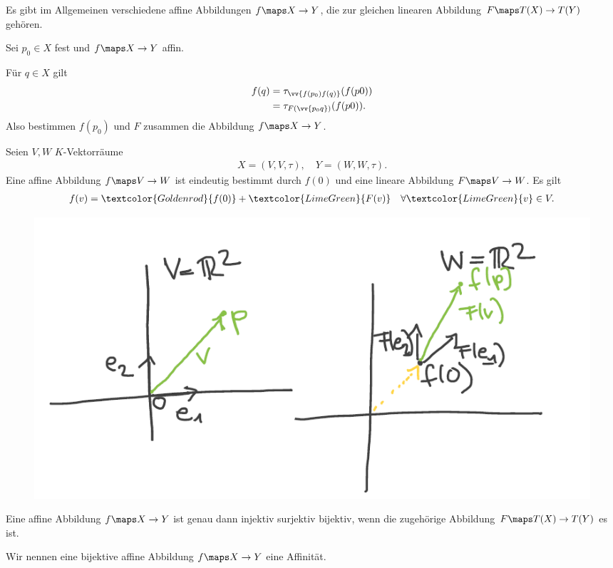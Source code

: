 \begin{bemerkung*}
    \begin{eigenschaftenenumerate}
        \item Es gibt im Allgemeinen verschiedene affine Abbildungen \( f\maps X \to Y \), die zur gleichen linearen Abbildung \( F\maps T(X)\to T(Y) \) gehören.
        \item Sei \( p_0 \in X \) fest und \( f\maps X \to Y \) affin.
        
        Für \( q\in X \) gilt
        \begin{align*}
            f(q)\begin{aligned}[t] 
                &=\tau_{\vv{f(p_0)f(q)}}(f(p0))\\
            &=\tau_{F(\vv{p_0 q})}(f(p0)).
            \end{aligned}
        \end{align*}
        Also bestimmen \( f(p_0) \) und \( F \) zusammen die Abbildung \( f\maps X\to Y \).
    \end{eigenschaftenenumerate}


\end{bemerkung*}
\begin{beispiel*}
    Seien \( V,W \) \( K \)-Vektorräume
    \begin{align*}
        X=(V,V,\tau),\quad Y=(W,W,\tau).
    \end{align*}
    Eine affine Abbildung \( f\maps V\to W \) ist eindeutig bestimmt durch \( f(0) \) und eine lineare Abbildung \( F\maps V\to W \). Es gilt
    \begin{align*}
        f(v)=\textcolor{Goldenrod}{f(0)}+\textcolor{LimeGreen}{F(v)}\quad\forall \textcolor{LimeGreen}{v} \in V.
    \end{align*}
\end{beispiel*}
\begin{figure}[H]
    \centering
    \includegraphics[width=0.7\linewidth]{figures/affine_abbildungen_vektorraeume}
    \label{fig:affine_abbildungen_vektorraeume}
\end{figure}
\begin{bemuebung*}
    Eine affine Abbildung \( f\maps X \to Y \) ist genau dann injektiv \bzw surjektiv \bzw bijektiv, wenn die zugehörige Abbildung \( F\maps T(X)\to T(Y) \) es ist.
\end{bemuebung*}
\begin{definition*}
    Wir nennen eine bijektive affine Abbildung \( f\maps X \to Y \) eine Affinität.
\end{definition*}
